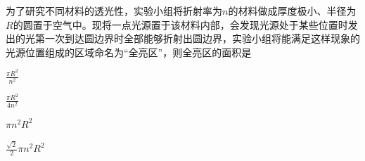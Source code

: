 为了研究不同材料的透光性，实验小组将折射率为\(n\)的材料做成厚度极小、半径为\(R\)的圆置于空气中。现将一点光源置于该材料内部，会发现光源处于某些位置时发出的光第一次到达圆边界时全部能够折射出圆边界，实验小组将能满足这样现象的光源位置组成的区域命名为“全亮区”，则全亮区的面积是\paren[]

\begin{choices}
	\item \(\frac{\pi R^2}{n^2}\)
	\item \(\frac{\pi R^2}{4n^2}\)
	\item \(\pi n^2R^2\)
	\item \(\frac{\sqrt{2}}{2}\pi n^2R^2 \)
\end{choices}